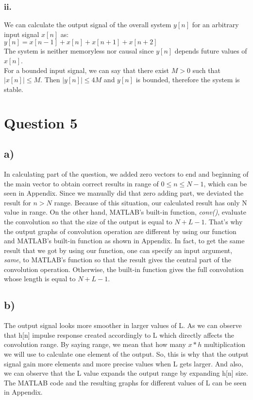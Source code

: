 \documentclass[12pt]{article}
\begin{document}
    \subsubsection*{ii.}
    We can calculate the output signal of the overall system \(y[n]\)
    for an arbitrary input signal \(x[n]\) as:\\
    \begin{math}
      y[n] = x[n-1] + x[n] + x[n+1] + x[n+2]
    \end{math}\\
    The system is neither memoryless nor causal since \(y[n]\)
    depends future values of \(x[n]\).\\
    For a bounded input signal, we can say that there exist \(M > 0\) 
    such that \(\left\lvert x[n]\right\rvert \leq M \). Then \(\left\lvert y[n]\right\rvert  \leq 4M\) 
    and \(y[n]\) is bounded, therefore the system is stable. 
   
    \section*{Question 5}
    \subsection*{a)}
In calculating part of the question, we added zero vectors to end and beginning of the main vector to obtain correct results in range of \(0\leq n \leq N-1\), which can be seen in Appendix. Since we manually did that zero adding part, we deviated the result for \(n>N\) range. Because of this situation, our calculated result has only N value in range. On the other hand, MATLAB’s built-in function, \emph{conv()}, evaluate the convolution so that the size of the output is equal to \(N+L-1\). That's why the output graphs of convolution operation are different by using our function and MATLAB's built-in function as shown in Appendix. In fact, to get the same result that we got by using our function, one can specify an input argument, \emph{same}, to MATLAB's function so that the result gives the central part of the convolution operation. Otherwise, the built-in function gives the full convolution whose length is equal to \(N+L-1\).
\subsection*{b)}
The output signal looks more smoother in larger values of L. As we can observe that h[n] impulse response created accordingly to L which directly affects the convolution range. By saying range, we mean that how many \(x*h\) multiplication we will use to calculate one element of the output. So, this is why that the output signal gain more elements and more precise values when L gets larger. And also, we can observe that the L value expands the output range by expanding h[n] size. The MATLAB code and the resulting graphs for different values of L can be seen in Appendix. 

    
\end{document}
